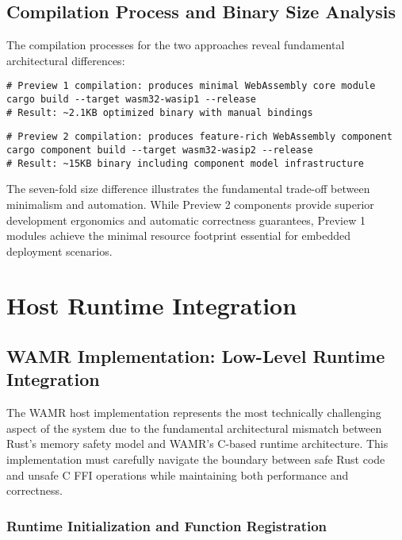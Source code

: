 \subsection{Compilation Process and Binary Size Analysis}

The compilation processes for the two approaches reveal fundamental architectural differences:

\begin{verbatim}
# Preview 1 compilation: produces minimal WebAssembly core module
cargo build --target wasm32-wasip1 --release
# Result: ~2.1KB optimized binary with manual bindings
\end{verbatim}

\begin{verbatim}
# Preview 2 compilation: produces feature-rich WebAssembly component
cargo component build --target wasm32-wasip2 --release
# Result: ~15KB binary including component model infrastructure
\end{verbatim}

The seven-fold size difference illustrates the fundamental trade-off between minimalism and automation. While Preview 2 components provide superior development ergonomics and automatic correctness guarantees, Preview 1 modules achieve the minimal resource footprint essential for embedded deployment scenarios.

\section{Host Runtime Integration}
\label{sec:host-runtime-integration}

\subsection{WAMR Implementation: Low-Level Runtime Integration}

The WAMR host implementation represents the most technically challenging aspect of the system due to the fundamental architectural mismatch between Rust's memory safety model and WAMR's C-based runtime architecture. This implementation must carefully navigate the boundary between safe Rust code and unsafe C FFI operations while maintaining both performance and correctness.

\subsubsection{Runtime Initialization and Function Registration}

